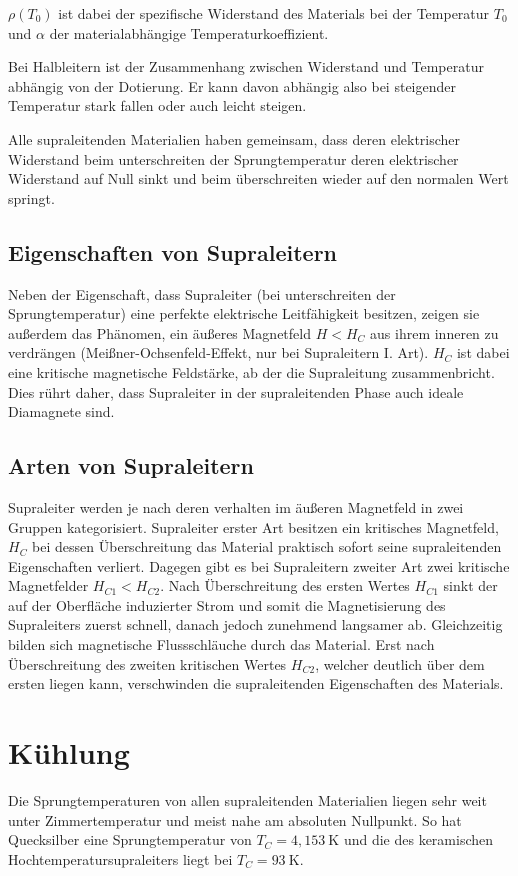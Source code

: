 \documentclass[bigchapter,colorback,accentcolor=tud4b,linedtoc,11pt]{tudreport}
\numberwithin{equation}{subsection}
\begin{document}
\(\rho(T_0)\) ist dabei der spezifische Widerstand des Materials bei der Temperatur \(T_0\) und \(\alpha\) der materialabhängige Temperaturkoeffizient.

Bei Halbleitern ist der Zusammenhang zwischen Widerstand und Temperatur abhängig von der Dotierung. Er kann davon abhängig also bei steigender Temperatur stark fallen oder auch leicht steigen.

Alle supraleitenden Materialien haben gemeinsam, dass deren elektrischer Widerstand beim unterschreiten der Sprungtemperatur deren elektrischer Widerstand auf Null sinkt und beim überschreiten wieder auf den normalen Wert springt.

\subsection{Eigenschaften von Supraleitern}
Neben der Eigenschaft, dass Supraleiter (bei unterschreiten der Sprungtemperatur) eine perfekte elektrische Leitfähigkeit besitzen, zeigen sie außerdem das Phänomen, ein äußeres Magnetfeld \(H < H_C\) aus ihrem inneren zu verdrängen (Meißner-Ochsenfeld-Effekt, nur bei Supraleitern I. Art). \(H_C\) ist dabei eine kritische magnetische Feldstärke, ab der die Supraleitung zusammenbricht. Dies rührt daher, dass Supraleiter in der supraleitenden Phase auch ideale Diamagnete sind.

\subsection{Arten von Supraleitern}
Supraleiter werden je nach deren verhalten im äußeren Magnetfeld in zwei Gruppen kategorisiert. Supraleiter erster Art besitzen ein kritisches Magnetfeld, $H_C$ bei dessen Überschreitung das Material praktisch sofort seine supraleitenden Eigenschaften verliert. Dagegen gibt es bei Supraleitern zweiter Art zwei kritische Magnetfelder $H_{C1} < H_{C2}$. Nach Überschreitung des ersten Wertes $H_{C1}$ sinkt der auf der Oberfläche induzierter Strom und somit die Magnetisierung des Supraleiters zuerst schnell, danach jedoch zunehmend langsamer ab. Gleichzeitig bilden sich magnetische Flussschläuche durch das Material. Erst nach Überschreitung des zweiten kritischen Wertes $H_{C2}$, welcher deutlich über dem ersten liegen kann, verschwinden die supraleitenden Eigenschaften des Materials.

\section{Kühlung}
Die Sprungtemperaturen von allen supraleitenden Materialien liegen sehr weit unter Zimmertemperatur und meist nahe am absoluten Nullpunkt. So hat Quecksilber eine Sprungtemperatur von \(T_C = 4,153 \ \mathrm{K}\) und die des keramischen Hochtemperatursupraleiters  liegt bei \(T_C = 93 \ \mathrm{K}\).
\end{document}
